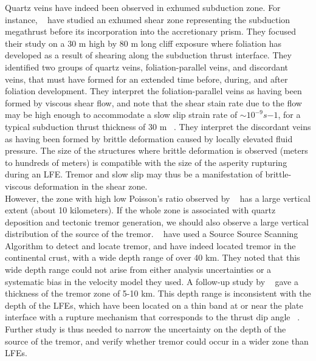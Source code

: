 \documentclass[draft]{agujournal2019}
\begin{document}
Quartz veins have indeed been observed in exhumed subduction zone. For instance, ~ have studied an exhumed shear zone representing the subduction megathrust before its incorporation into the accretionary prism. They focused their study on a 30 m high by 80 m long cliff exposure where foliation has developed as a result of shearing along the subduction thrust interface. They identified two groups of quartz veins, foliation-parallel veins, and discordant veins, that must have formed for an extended time before, during, and after foliation development. They interpret the foliation-parallel veins as having been formed by viscous shear flow, and note that the shear stain rate due to the flow may be high enough to accommodate a slow slip strain rate of $\sim 10^{-9} s{-1}$, for a typical subduction thrust thickness of 30 m ~\cite{ROW_2013}. They interpret the discordant veins as having been formed by brittle deformation caused by locally elevated fluid pressure. The size of the structures where brittle deformation is observed (meters to hundreds of meters) is compatible with the size of the asperity rupturing during an LFE. Tremor and slow slip may thus be a manifestation of brittle-viscous deformation in the shear zone. \\

However, the zone with high low Poisson's ratio observed by ~ has a large vertical extent (about 10 kilometers). If the whole zone is associated with quartz deposition and tectonic tremor generation, we should also observe a large vertical distribution of the source of the tremor. ~ have used a Source Source Scanning Algorithm to detect and locate tremor, and have indeed located tremor in the continental crust, with a wide depth range of over 40 km. They noted that this wide depth range could not arise from either analysis uncertainties or a systematic bias in the velocity model they used. A follow-up study by ~ gave a thickness of the tremor zone of 5-10 km. This depth range is inconsistent with the depth of the LFEs, which have been located on a thin band at or near the plate interface with a rupture mechanism that corresponds to the thrust dip angle ~\cite{IDE_2007_GRL}. Further study is thus needed to narrow the uncertainty on the depth of the source of the tremor, and verify whether tremor could occur in a wider zone than LFEs. \\
\end{document}
